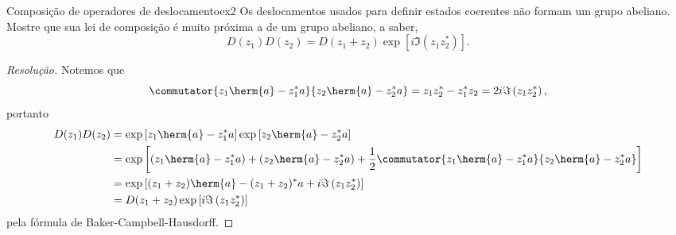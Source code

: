 \begin{exercício}{Composição de operadores de deslocamento}{ex2}
    Os deslocamentos usados para definir estados coerentes não formam um grupo abeliano. Mostre que sua lei de composição é muito próxima a de um grupo abeliano, a saber,
    \begin{equation*}
       D(z_1) D(z_2) = D(z_1 + z_2) \exp\left[i \Im(z_1 z_2^*)\right].
    \end{equation*}
\end{exercício}
\begin{proof}[Resolução]
    Notemos que
    \begin{equation*}
       \commutator{z_1 \herm{a} - z_1^* a}{z_2 \herm{a} - z_2^* a} = z_1 z_2^* -  z_1^* z_2 = 2i \Im\left(z_1 z_2^*\right),
    \end{equation*}
    portanto
    \begin{align*}
       D(z_1)D(z_2) &= \exp\left[z_1 \herm{a} - z_1^* a\right]\exp\left[z_2 \herm{a} - z_2^* a\right]\\
                    &= \exp\left[\left(z_1 \herm{a} - z_1^* a\right) + \left(z_2 \herm{a} - z_2^* a\right) + \frac12\commutator{z_1 \herm{a} - z_1^* a}{z_2 \herm{a} - z_2^* a} \right]\\
                    &= \exp\left[(z_1 + z_2) \herm{a} - (z_1 + z_2)^* a + i \Im\left(z_1 z_2^*\right)\right]\\
                    &= D(z_1 + z_2) \exp\left[i \Im\left(z_1 z_2^*\right)\right]
    \end{align*}
    pela fórmula de Baker-Campbell-Hausdorff.
\end{proof}
